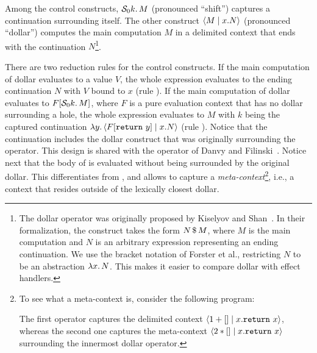 Among the control constructs, $\mathcal{S}_0 k.\, M$ (pronounced ``shift'')
captures a continuation surrounding itself.
The other construct $\langle M \mid x.N \rangle$ (pronounced ``dollar'') computes
the main computation $M$ in a delimited context that ends with the
continuation $N$\footnote{The dollar operator was originally proposed by 
Kiselyov and Shan~\cite{kiselyov-substructural}.
In their formalization, the construct takes the form $N \, \$ \, M$,
where $M$ is the main computation and $N$ is an arbitrary expression
representing an ending continuation.
We use the bracket notation of Forster et al., restricting $N$ to be an 
abstraction $\lambda x.\, N$.
This makes it easier to compare dollar with effect handlers.}.

There are two reduction rules for the control constructs.
If the main computation of dollar evaluates to a value $V$, the whole
expression evaluates to the ending continuation $N$ with $V$ bound to $x$
(rule ).
If the main computation of dollar evaluates to $F[\mathcal{S}_0 k.\, M]$, where $F$ 
is a pure evaluation context that has no dollar surrounding a hole, the whole 
expression evaluates to $M$ with $k$ being the captured continuation
$\lambda y.\, \langle F[\texttt{return} \ y] \mid x.N \rangle$
(rule ).
Notice that the continuation includes the dollar construct that was
originally surrounding the \shiftztt operator.
This design is shared with the \shifttt operator of Danvy and
Filinski~\cite{danvy-abstracting}.
Notice next that the body of \shiftztt is evaluated without being surrounded
by the original dollar.
This differentiates \shiftztt from \shifttt, and allows \shiftztt to capture
a \textit{meta-context}\footnote{To see what a meta-context is, consider the 
following program:

\vspace{-2mm}


\noindent The first \shiftztt operator captures the delimited context 
$\langle 1 + [] \mid x.\texttt{return} \ x \rangle$, whereas the second one captures the 
meta-context $\langle 2 * [] \mid x.\texttt{return} \ x \rangle$ surrounding the innermost
dollar operator.}, i.e., a context that resides outside of the lexically 
closest dollar.

\Lambdasz
